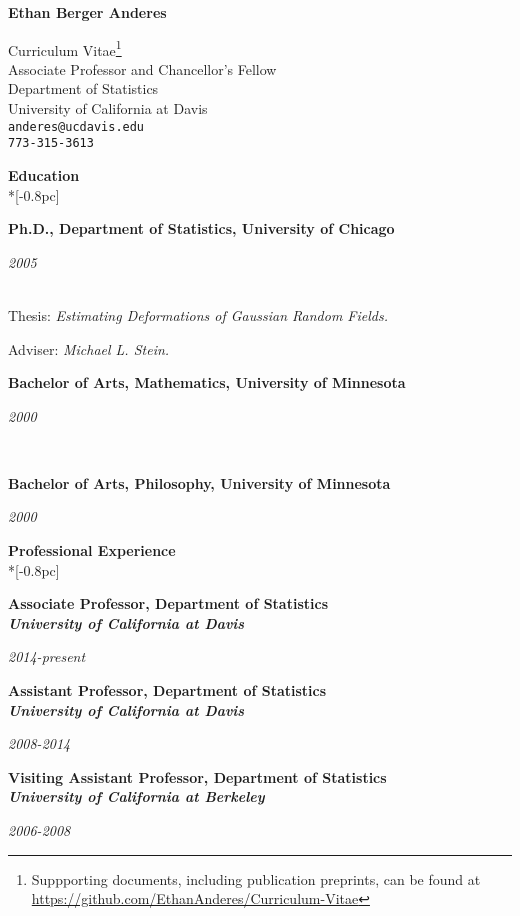 \documentclass[11pt]{article}
\newcommand{\head}[1]{
  \vspace{10pt}
  {\Large \bf #1} \\*[-0.8pc]
  \underline{\hspace{6.07in}}}
\newcommand{\datedentry}[2]{
  \vspace{5pt}
  \begin{minipage}{5in}{\textbf{#1}}\end{minipage}
  \hfill
  \begin{minipage}{1in}{\hfill\textit{#2}}\end{minipage}
  }
\begin{document}
\begin{center}
  \begin{Large}
    \textbf{Ethan Berger Anderes} \\ \vspace{5pt}
  \end{Large}
  Curriculum Vitae\footnote{Suppporting documents, including publication preprints, can be found at \url{https://github.com/EthanAnderes/Curriculum-Vitae}}\\
  Associate Professor and Chancellor's Fellow \\
  Department of Statistics\\
  University of California at Davis\\
  \texttt{anderes@ucdavis.edu}\\
  \texttt{773-315-3613}
\end{center}

\flushleft
\head{Education}%


\datedentry{Ph.D., Department of Statistics, University of Chicago}{ 2005}\\
\vspace{5pt}
Thesis: %
{\sl Estimating Deformations of Gaussian Random Fields.}

Adviser: {\sl Michael L. Stein.}

\vspace{2pt}

\datedentry{Bachelor of Arts, Mathematics, University of Minnesota }{2000}\\
\vspace{4pt}
\datedentry{Bachelor of Arts, Philosophy, University of Minnesota }{2000}

\head{Professional Experience}%


\datedentry{Associate Professor, Department of Statistics\\
{\sl University of California at Davis}}{2014-present}

\vspace{7pt}


\datedentry{Assistant Professor, Department of Statistics\\
{\sl University of California at Davis}}{2008-2014}

\vspace{7pt}

\datedentry{Visiting Assistant Professor, Department of Statistics\\
{\sl University of California at Berkeley}}{2006-2008}
\end{document}
